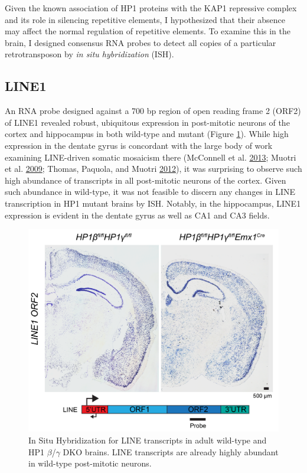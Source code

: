 \documentclass[onehalf,12pt]{beavtex}
\begin{document}
  Given the known association of HP1 proteins with the KAP1 repressive
  complex and its role in silencing repetitive elements, I hypothesized
  that their absence may affect the normal regulation of repetitive
  elements. To examine this in the brain, I designed consensus RNA probes
  to detect all copies of a particular retrotransposon by \emph{in situ
  hybridization} (ISH).
  
  \subsection{LINE1}\label{line1}
  
  An RNA probe designed against a 700 bp region of open reading frame 2
  (ORF2) of LINE1 revealed robust, ubiquitous expression in post-mitotic
  neurons of the cortex and hippocampus in both wild-type and mutant
  (Figure \ref{fig:LINEish}). While high expression in the dentate gyrus
  is concordant with the large body of work examining LINE-driven somatic
  mosaicism there (McConnell et al.
  \protect\hyperlink{ref-McConnellMosaiccopynumber2013}{2013}; Muotri et
  al. \protect\hyperlink{ref-MuotriEnvironmentalinfluenceL12009}{2009};
  Thomas, Paquola, and Muotri
  \protect\hyperlink{ref-ThomasLINE1RetrotranspositionNervous2012}{2012}),
  it was surprising to observe such high abundance of transcripts in all
  post-mitotic neurons of the cortex. Given such abundance in wild-type,
  it was not feasible to discern any changes in LINE transcription in HP1
  mutant brains by ISH. Notably, in the hippocampus, LINE1 expression is
  evident in the dentate gyrus as well as CA1 and CA3 fields.
  
  \begin{figure}
  
  {\centering \includegraphics[width=1\linewidth, ]{./figure/results/LINEish} 
  
  }
  
  \caption[In Situ Hybridization for LINE1 ORF2 in Adult Wildtype and HP1DKO Brains]{In Situ Hybridization for LINE transcripts in adult wild-type and HP1 $\beta$/$\gamma$ DKO brains.  LINE transcripts are already highly abundant in wild-type  post-mitotic neurons.}\label{fig:LINEish}
  \end{figure}
  
\end{document}
